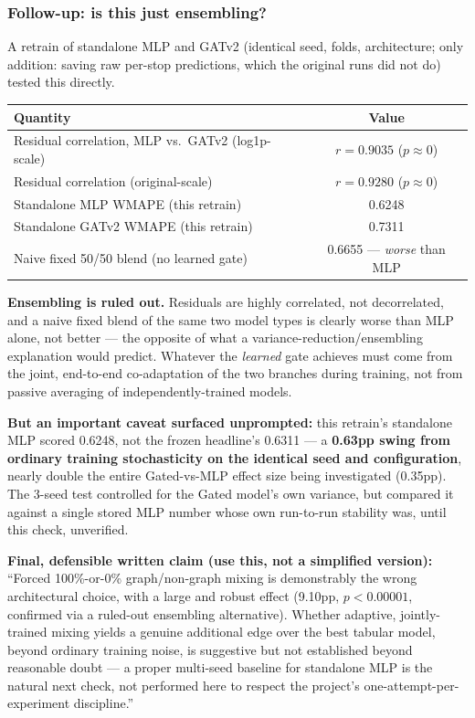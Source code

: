 \documentclass[11pt]{article}
\begin{document}
\subsubsection{Follow-up: is this just ensembling?}
A retrain of standalone MLP and GATv2 (identical seed, folds, architecture; only addition:
saving raw per-stop predictions, which the original runs did not do) tested this directly.

\begin{center}
\small
\begin{tabular}{@{}lc@{}}
\toprule
\textbf{Quantity} & \textbf{Value} \\
\midrule
Residual correlation, MLP vs.\ GATv2 (log1p-scale) & $r=0.9035$ ($p\approx0$) \\
Residual correlation (original-scale) & $r=0.9280$ ($p\approx0$) \\
Standalone MLP WMAPE (this retrain) & 0.6248 \\
Standalone GATv2 WMAPE (this retrain) & 0.7311 \\
Naive fixed 50/50 blend (no learned gate) & 0.6655 --- \emph{worse} than MLP \\
\bottomrule
\end{tabular}
\end{center}

\textbf{Ensembling is ruled out.} Residuals are highly correlated, not decorrelated, and a
naive fixed blend of the same two model types is clearly worse than MLP alone, not better ---
the opposite of what a variance-reduction/ensembling explanation would predict. Whatever the
\emph{learned} gate achieves must come from the joint, end-to-end co-adaptation of the two
branches during training, not from passive averaging of independently-trained models.

\textbf{But an important caveat surfaced unprompted:} this retrain's standalone MLP scored
0.6248, not the frozen headline's 0.6311 --- a \textbf{0.63pp swing from ordinary training
stochasticity on the identical seed and configuration}, nearly double the entire
Gated-vs-MLP effect size being investigated (0.35pp). The 3-seed test controlled for the
Gated model's own variance, but compared it against a single stored MLP number whose own
run-to-run stability was, until this check, unverified.

\textbf{Final, defensible written claim (use this, not a simplified version):} ``Forced
100\%-or-0\% graph/non-graph mixing is demonstrably the wrong architectural choice, with a
large and robust effect (9.10pp, $p<0.00001$, confirmed via a ruled-out ensembling
alternative). Whether adaptive, jointly-trained mixing yields a genuine additional edge over
the best tabular model, beyond ordinary training noise, is suggestive but not established
beyond reasonable doubt --- a proper multi-seed baseline for standalone MLP is the natural
next check, not performed here to respect the project's one-attempt-per-experiment
discipline.''
\end{document}
